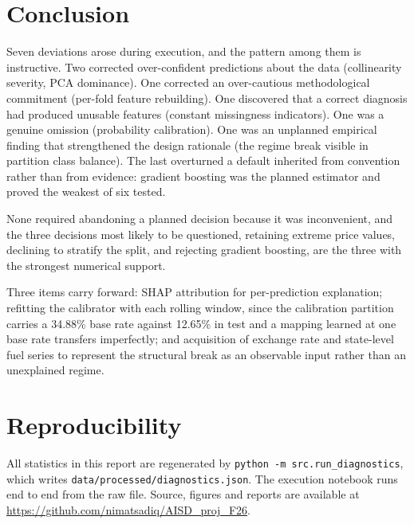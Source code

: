 \documentclass[conference]{IEEEtran}
\begin{document}
\section{Conclusion}

Seven deviations arose during execution, and the pattern among them is
instructive. Two corrected over-confident predictions about the data
(collinearity severity, PCA dominance). One corrected an over-cautious
methodological commitment (per-fold feature rebuilding). One discovered that a
correct diagnosis had produced unusable features (constant missingness
indicators). One was a genuine omission (probability calibration). One was an
unplanned empirical finding that strengthened the design rationale (the
regime break visible in partition class balance). The last overturned a
default inherited from convention rather than from evidence: gradient boosting
was the planned estimator and proved the weakest of six tested.

None required abandoning a planned decision because it was inconvenient, and
the three decisions most likely to be questioned, retaining extreme price
values, declining to stratify the split, and rejecting gradient boosting, are
the three with the strongest numerical support.

Three items carry forward: SHAP attribution for per-prediction explanation;
refitting the calibrator with each rolling window, since the calibration
partition carries a 34.88\% base rate against 12.65\% in test and a mapping
learned at one base rate transfers imperfectly; and acquisition of exchange
rate and state-level fuel series to represent the structural break as an
observable input rather than an unexplained regime.

\section*{Reproducibility}

All statistics in this report are regenerated by
\texttt{python -m src.run\_diagnostics}, which writes
\texttt{data/processed/diagnostics.json}. The execution notebook runs end to
end from the raw file. Source, figures and reports are available at
\url{https://github.com/nimatsadiq/AISD_proj_F26}.
\end{document}
